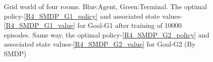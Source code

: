 \documentclass[preprint,12pt]{elsarticle}
\begin{document}
\begin{figure}[H]
	\centering  
	\caption{Grid world of four rooms.  Blue:Agent, Green:Terminal. The optimal policy-\ref{R4_SMDP_G1_policy} and associated state values-\ref{R4_SMDP_G1_value} for Goal-G1 after training of 10000 episodes. Same way, the optimal policy-\ref{R4_SMDP_G2_policy} and associated state values-\ref{R4_SMDP_G2_value} for Goal-G2 (By SMDP) }
	\label{fig:R4_SMDP}
\end{figure}
\end{document}
